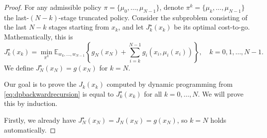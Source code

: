 \documentclass[
]{book}
\theoremstyle{definition}
\theoremstyle{definition}
\theoremstyle{definition}
\theoremstyle{definition}
\theoremstyle{remark}
\begin{document}
\begin{proof}
For any admissible policy \(\pi = \{ \mu_0,\dots,\mu_{N-1} \}\), denote \(\pi^k = \{ \mu_k,\dots,\mu_{N-1} \}\) the last-\((N-k)\)-stage truncated policy. Consider the subproblem consisting of the last \(N-k\) stages starting from \(x_k\), and let \(J^\star_k(x_k)\) be its optimal cost-to-go. Mathematically, this is
\begin{equation}
J^\star_{k}(x_k) = \min_{\pi^k} \mathbb{E}_{w_k,\dots,w_{N-1}} \left\{ g_N(x_N) + \sum_{i=k}^{N-1} g_i (x_i,\mu_i(x_i)) \right\}, \quad k=0,1,\dots,N-1.
\label{eq:dptheoremdefineJkstar}
\end{equation}
We define \(J^\star_N(x_N) = g(x_N)\) for \(k=N\).

Our goal is to prove the \(J_k(x_k)\) computed by dynamic programming from \eqref{eq:dpbackwardrecursion} is equal to \(J^\star_k (x_k)\) for all \(k=0,\dots,N\). We will prove this by induction.

Firstly, we already have \(J^\star_N(x_N) = J_N(x_N) = g(x_N)\), so \(k=N\) holds automatically.


\end{proof}
\end{document}
